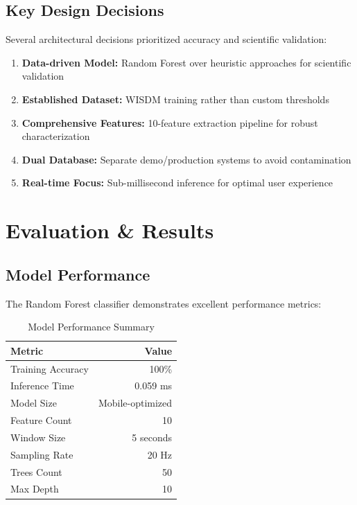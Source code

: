 \documentclass[11pt,a4paper]{article}
\begin{document}
\subsection{Key Design Decisions}

Several architectural decisions prioritized accuracy and scientific validation:

\begin{enumerate}
    \item \textbf{Data-driven Model:} Random Forest over heuristic approaches for scientific validation
    \item \textbf{Established Dataset:} WISDM training rather than custom thresholds
    \item \textbf{Comprehensive Features:} 10-feature extraction pipeline for robust characterization
    \item \textbf{Dual Database:} Separate demo/production systems to avoid contamination
    \item \textbf{Real-time Focus:} Sub-millisecond inference for optimal user experience
\end{enumerate}

\section{Evaluation \& Results}

\subsection{Model Performance}

The Random Forest classifier demonstrates excellent performance metrics:

\begin{table}[H]
    \centering
    \caption{Model Performance Summary}
    \begin{tabular}{@{}lr@{}}
        \toprule
        \textbf{Metric} & \textbf{Value} \\
        \midrule
        Training Accuracy & 100\% \\
        Inference Time & 0.059 ms \\
        Model Size & Mobile-optimized \\
        Feature Count & 10 \\
        Window Size & 5 seconds \\
        Sampling Rate & 20 Hz \\
        Trees Count & 50 \\
        Max Depth & 10 \\
        \bottomrule
    \end{tabular}
    \label{tab:performance}
\end{table}
\end{document}
